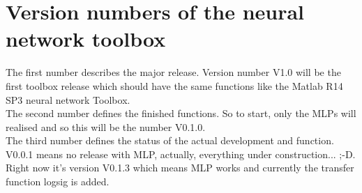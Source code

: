 \section{Version numbers of the neural network toolbox}

The first number describes the major release. Version number V1.0 will be the first toolbox release which should have the same functions like the Matlab R14 SP3 neural network Toolbox.\\

The second number defines the finished functions. So to start, only the MLPs will realised and so this will be the number V0.1.0.\\

The third number defines the status of the actual development and function. V0.0.1 means no release with MLP, actually, everything under construction... ;-D.\\

Right now it's version V0.1.3 which means MLP works and currently the transfer function logsig is added.